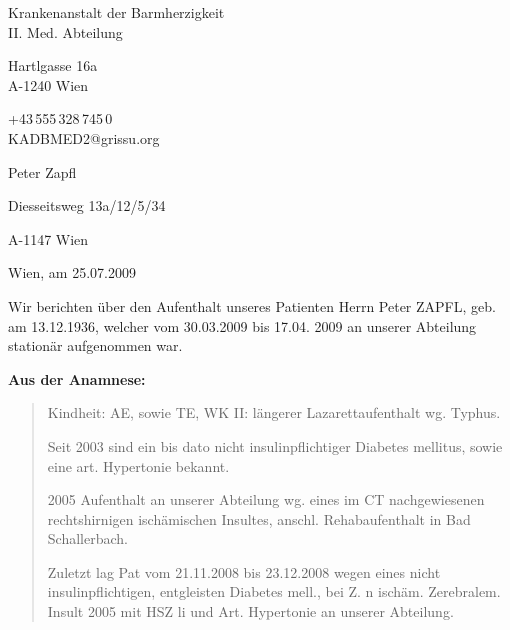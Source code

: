 {\ttfamily




\begin{flushright}
 Krankenanstalt der Barmherzigkeit \\II. Med. Abteilung
 
 Hartlgasse 16a \\A-1240 Wien
 
+43\,555\,328\,745\,0\\KADBMED2@grissu.org

\end{flushright}

                                                                                               

\vspace{1.5em}
                                                                                                                            


 Peter Zapfl\par
Diesseitsweg 13a/12/5/34 \par
A-1147 Wien
\vspace{3em}

\begin{flushright}
Wien, am 25.07.2009
\end{flushright}

  Wir berichten über den Aufenthalt unseres Patienten Herrn Peter ZAPFL, geb.
  am 13.12.1936, welcher vom 30.03.2009 bis 17.04. 2009 an unserer Abteilung
  stationär aufgenommen war.

{\bfseries   Aus der Anamnese:}

\begin{quote}
  Kindheit: AE, sowie TE, WK II: längerer Lazarettaufenthalt wg.
  Typhus.
  
  Seit 2003 sind ein bis dato nicht insulinpflichtiger Diabetes mellitus, sowie
  eine art. Hypertonie bekannt.
  
  2005 Aufenthalt an unserer Abteilung wg. eines im CT nachgewiesenen rechtshirnigen ischämischen Insultes,
  anschl. Rehabaufenthalt in Bad Schallerbach.
  
  Zuletzt lag Pat vom 21.11.2008 bis 23.12.2008 wegen eines nicht
  insulinpflichtigen, entgleisten Diabetes mell., bei Z. n ischäm. Zerebralem.
  Insult 2005 mit HSZ li und Art.
  Hypertonie an unserer Abteilung.
  

\end{quote}}
